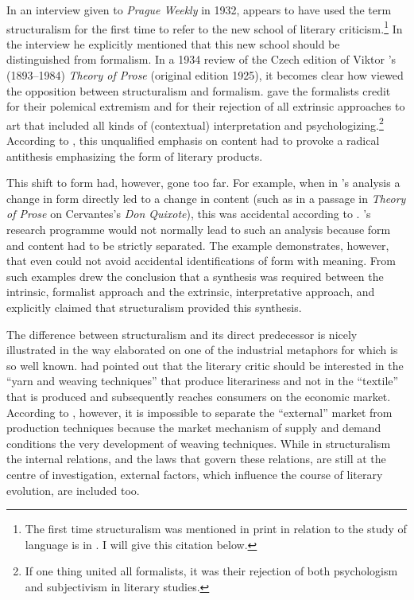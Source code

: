 \documentclass[output=paper]{langscibook}
\begin{document}
In an interview given to \emph{Prague Weekly} in 1932, {\Mukarovsky} appears to have used the term structuralism for the first time to refer to the new school of literary criticism.\footnote{The first time structuralism was mentioned in print in relation to the study of language is in \citet{Jakobson1929}. I will give this citation below.} In the interview he explicitly mentioned that this new school should be distinguished from formalism. In a 1934 review of the Czech edition of Viktor {\Shklovsky}'s (1893--1984) \emph{Theory of Prose} (original edition 1925), it becomes clear how {\Mukarovsky} viewed the opposition between structuralism and formalism. {\Mukarovsky} gave the formalists credit for their polemical extremism and for their rejection of all extrinsic approaches to art that included all kinds of (contextual) interpretation and psychologizing.\footnote{If one thing united all formalists, it was their rejection of both psychologism and subjectivism in literary studies.} According to {\Mukarovsky}, this unqualified emphasis on content had to provoke a radical antithesis emphasizing the form of literary products. 

 
This shift to form had, however, gone too far. For example, when in {\Shklovsky}'s analysis a change in form directly led to a change in content (such as in a passage in \emph{Theory of Prose} on Cervantes’s \emph{Don Quixote}), this was accidental according to {\Mukarovsky}. {\Shklovsky}'s research programme would not normally lead to such an analysis because form and content had to be strictly separated. The example demonstrates, however, that even {\Shklovsky} could not avoid accidental identifications of form with meaning. From such examples {\Mukarovsky} drew the conclusion that a synthesis was required between the intrinsic, formalist approach and the extrinsic, interpretative approach, and {\Mukarovsky} explicitly claimed that structuralism provided this synthesis. 

The difference between structuralism and its direct predecessor is nicely illustrated in the way {\Mukarovsky} elaborated on one of the industrial metaphors for which {\Shklovsky} is so well known. {\Shklovsky} had pointed out that the literary critic should be interested in the ``yarn and weaving techniques'' that produce literariness and not in the ``textile'' that is produced and subsequently reaches consumers on the economic market.  According to {\Mukarovsky}, however, it is impossible to separate the ``external'' market from production techniques because the market mechanism of supply and demand conditions the very development of weaving techniques. While in structuralism the internal relations, and the laws that govern these relations, are still at the centre of investigation, external factors, which influence the course of literary evolution, are included too. 
\end{document}
